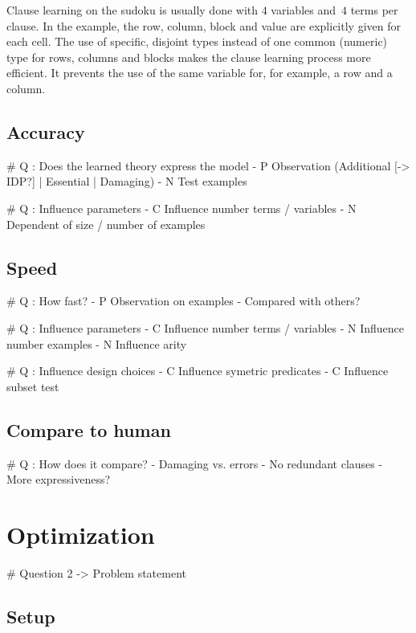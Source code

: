 Clause learning on the sudoku is usually done with $4$ variables and~$4$ terms per clause.
In the example, the row, column, block and value are explicitly given for each cell.
The use of specific, disjoint types instead of one common (numeric) type for rows, columns and blocks makes the clause learning process more efficient.
It prevents the use of the same variable for, for example, a row and a column.

\subsection{Accuracy}

\# Q : Does the learned theory express the model
- P Observation (Additional [-> IDP?] | Essential | Damaging)
- N Test examples

\# Q : Influence parameters
- C Influence number terms / variables
- N Dependent of size / number of examples

\subsection{Speed}

\# Q : How fast?
- P Observation on examples
- Compared with others?

\# Q : Influence parameters
- C Influence number terms / variables
- N Influence number examples
- N Influence arity

\# Q : Influence design choices
- C Influence symetric predicates
- C Influence subset test

\subsection{Compare to human}

\# Q : How does it compare?
- Damaging vs. errors
- No redundant clauses
- More expressiveness?

\section{Optimization}

\# Question 2
-> Problem statement

\subsection{Setup}

